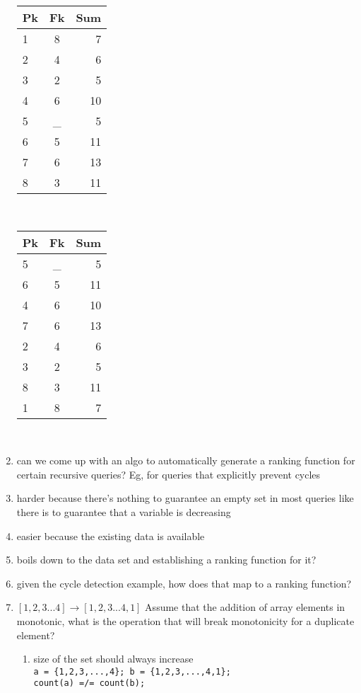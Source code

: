 \documentclass[12pt]{article}
\begin{document}
\begin{enumerate}
    \begin{tabular}{| l | c || r |}
      \hline
      Pk & Fk & Sum \\
      \hline
      1 & 8 & 7 \\
      2 & 4 & 6 \\
      3 & 2 & 5 \\
      4 & 6 & 10 \\
      5 & _ & 5 \\
      6 & 5 & 11 \\
      7 & 6 & 13 \\
      8 & 3 & 11 \\
      \hline
    \end{tabular} \\

    \begin{tabular}{| l | c || r |}
      \hline
      Pk & Fk & Sum \\
      \hline
      5 & _ & 5 \\
      6 & 5 & 11 \\
      4 & 6 & 10 \\
      7 & 6 & 13 \\
      2 & 4 & 6 \\
      3 & 2 & 5 \\
      8 & 3 & 11 \\
      1 & 8 & 7 \\
      \hline
    \end{tabular} \\

    \item can we come up with an algo to automatically generate a ranking function for certain recursive queries? Eg, for queries that explicitly prevent cycles

    \item harder because there's nothing to guarantee an empty set in most queries like there is to guarantee that a variable is decreasing
    \item easier because the existing data is available
    \item boils down to the data set and establishing a ranking function for it?
    \item given the cycle detection example, how does that map to a ranking function?
    \item $[1,2,3 ... 4] \rightarrow [1,2,3 ... 4, 1]$ Assume that the addition of array elements in monotonic, what is the operation that will break monotonicity for a duplicate element?
    \begin{enumerate}
      \item size of the set should always increase \\
        \verb|a = {1,2,3,...,4}; b = {1,2,3,...,4,1};| \\
        \verb|count(a) =/= count(b);|
    \end{enumerate}


\end{enumerate}
\end{document}
